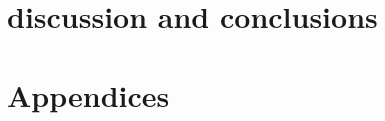 \documentclass[\classfontsize,\papersize,twoside,showtrims,extrafontsizes]{memoir}  %
\begin{document}
\part[discussion and conclusions]{discussion and conclusions}\label{part:discussion-and-conclusion}
% 
% 

\part[Appendices]{Appendices}
\appendix

% 
% 
% 


\backmatter
\printbibliography
\end{document}
